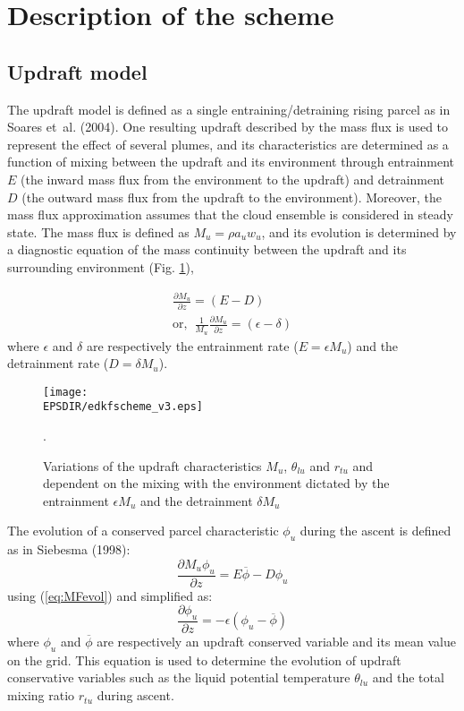 \section{Description of the scheme}
\subsection{Updraft model}

The updraft model is defined as a single entraining/detraining rising parcel as in Soares et~al. (2004). One resulting updraft described by the mass flux is used to represent the effect of several plumes, and its characteristics are determined as a function of mixing between the updraft and its environment through entrainment $E$ (the inward mass flux from the environment to the updraft) and detrainment $D$ (the outward mass flux from the updraft to the environment). Moreover, the mass flux approximation assumes that the cloud ensemble is considered in steady state. The mass flux is defined as $M_u=\rho a_u w_u$, and its evolution is determined by a diagnostic equation of the mass continuity between the updraft and its surrounding environment (Fig. \ref{fig:SchemeDes}), 

\begin{eqnarray}
\frac{\partial{M_u}}{\partial{z}}=(E-D)\\
\mathrm{or,\hspace{5pt}}   \frac{1}{M_u}\frac{\partial{M_u}}{\partial{z}}=(\epsilon-\delta)
\label{eq:MFevol}
\end{eqnarray}
where $\epsilon$ and $\delta$ are respectively the entrainment rate  ($E=\epsilon M_u$) and the detrainment rate ($D=\delta M_u$).

\begin{figure} 
	\begin{center}
		\texttt{[image: \\EPSDIR/edkfscheme\_v3.eps]}
	\end{center}
	\caption{Variations of the updraft characteristics $M_u$, $\theta_{lu}$ and $r_{tu}$ and dependent on the mixing with the environment dictated by the entrainment $\epsilon M_u$ and the detrainment $\delta M_u$}.
	\label{fig:SchemeDes}
\end{figure}

The evolution of a conserved parcel characteristic $\phi_u$ during the ascent is defined as in Siebesma (1998):\\
\begin{equation}
\frac{\partial{M_u\phi_u}}{\partial{z}}=E\overline{\phi}-D\phi_u
\label{eq:Phievol1}
\end{equation}
using (\ref{eq:MFevol}) and simplified as:
\begin{equation}
\frac{\partial{\phi_u}}{\partial{z}}=-\epsilon(\phi_u-\overline{\phi})
\label{eq:Phievol2}
\end{equation}
where $\phi_u$ and $\overline{\phi}$ are respectively an updraft conserved variable and its mean value on the grid. This equation is used to determine the evolution of updraft conservative variables such as the liquid potential temperature $\theta_{lu}$ and the total mixing ratio $r_{tu}$ during ascent.


